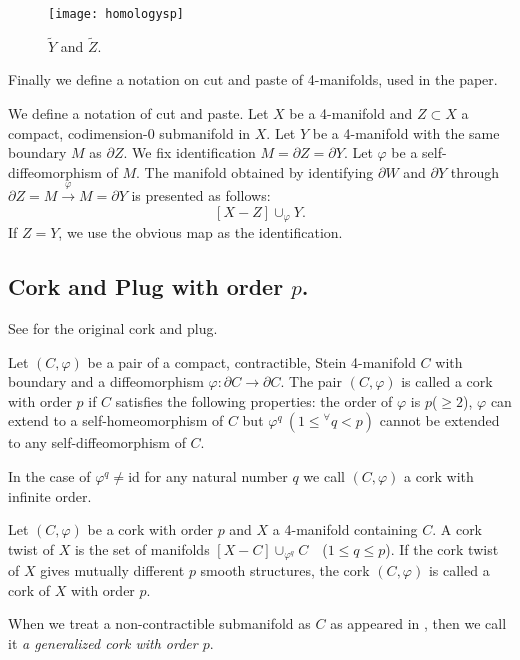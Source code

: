 \documentclass[11pt]{amsart}
\begin{document}
\begin{figure}[ht]
\begin{center}
\texttt{[image: homologysp]}
\caption{$\tilde{Y}$ and $\tilde{Z}$.}
\label{boundary}
\end{center}
\end{figure}
Finally we define a notation on cut and paste of 4-manifolds, used in the paper.
\begin{defi}
\label{cp}
We define a notation of cut and paste.
Let $X$ be a 4-manifold and $Z\subset X$ a compact, codimension-$0$ submanifold in $X$.
Let $Y$ be a 4-manifold with the same boundary $M$ as $\partial Z$.
We fix identification $M=\partial Z=\partial Y$.
Let $\varphi$ be a self-diffeomorphism of $M$.
The manifold obtained by identifying $\partial W$ and $\partial Y$ through $\partial Z=M\overset{\varphi}{\to}M=\partial Y$ 
is
presented as follows:
$$[X-Z]\cup_{\varphi} Y.$$
If $Z=Y$, we use the obvious map as the identification.
\end{defi}
\subsection{Cork and Plug with order $p$.}
See \cite{[AY1]} for the original cork and plug.
\begin{defi}
Let $(C,\varphi)$ be a pair of a compact, contractible, Stein 4-manifold $C$ with boundary and a diffeomorphism $\varphi:\partial C\to \partial C$.
The pair $(C,\varphi)$ is called a cork with order $p$ if $C$ satisfies the following properties:
the order of $\varphi$ is $p$($\ge 2$), $\varphi$ can extend to a self-homeomorphism of $C$ but
$\varphi^q\ (1\le {}^{\forall}q< p)$ cannot be extended to any self-diffeomorphism of $C$.

In the case of $\varphi^q\neq$id for any natural number $q$ we call $(C,\varphi)$ a cork with infinite order.

Let $(C,\varphi)$ be a cork with order $p$ and $X$ a 4-manifold
containing $C$.
A cork twist of $X$ is the set of manifolds $[X-C]\cup_{\varphi^q} C$\ \ ($1\le q\le p$).
If the cork twist of $X$ gives mutually different $p$ smooth structures,
the cork $(C,\varphi)$ is called a cork of $X$ with order $p$.
\end{defi}
When we treat a non-contractible submanifold as $C$ as appeared in \cite{[AY1]}, then
we call it {\it a generalized cork with order $p$}.
\end{document}
